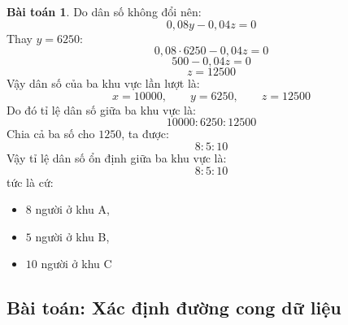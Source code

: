 \documentclass[12pt,a4paper,oneside]{book}
\theoremstyle{theorem}
\theoremstyle{definition}
\newtheorem{bt}[theorem2]{Bài toán}
\begin{document}
\begin{bt}
Do dân số không đổi nên:
\[
0,08y-0,04z=0
\]
Thay \(y=6250\):
\[
0,08\cdot6250-0,04z=0
\]
\[
500-0,04z=0
\]
\[
z=12500
\]
\bigskip
Vậy dân số của ba khu vực lần lượt là:
\[
x=10000,\qquad y=6250,\qquad z=12500
\]
Do đó tỉ lệ dân số giữa ba khu vực là:
\[
10000:6250:12500
\]
Chia cả ba số cho \(1250\), ta được:
\[
8:5:10
\]
\bigskip
Vậy tỉ lệ dân số ổn định giữa ba khu vực là:
\[
8:5:10
\]
tức là cứ:
\begin{itemize}
    \item \(8\) người ở khu A,
    
    \item \(5\) người ở khu B,
    
    \item \(10\) người ở khu C
    \end{itemize}
\end{bt}

\subsection{Bài toán: Xác định đường cong dữ liệu}
\end{document}
